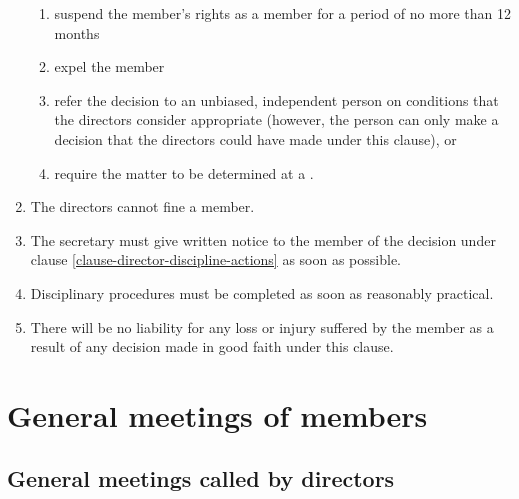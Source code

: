 \documentclass[a4paper]{article}
\let\emph\relax
\begin{document}
\begin{enumerate}
\begin{enumerate}
    \item suspend the member's rights as a member for a period of no more than 12 months
    \item expel the member
    \item refer the decision to an unbiased, independent person on conditions that the directors consider appropriate (however, the person can only make a decision that the directors could have made under this clause), or
    \item require the matter to be determined at a \emph{general meeting}.
    \end{enumerate}
\item The directors cannot fine a member.
\item The secretary must give written notice to the member of the decision under clause \ref{clause-director-discipline-actions} as soon as possible.
\item Disciplinary procedures must be completed as soon as reasonably practical.
\item There will be no liability for any loss or injury suffered by the member as a result of any decision made in good faith under this clause.
\end{enumerate}


\section{General meetings of members}

\subsection{General meetings called by directors}
\end{document}
